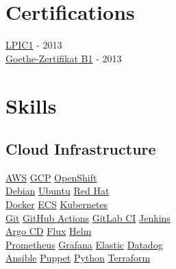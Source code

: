 \documentclass[]{willianpaixao-resume}
\begin{document}
\begin{minipage}[t]{0.35\textwidth}
\section{Certifications}
\href{https://www.lpi.org/certification/get-certified-lpi/lpic-1-linux-server-professional/}{LPIC1} - 2013 \\
\href{https://www.goethe.de/en/spr/kup/prf/prf/gb1.html}{Goethe-Zertifikat B1} - 2013
\sectionsep


\section{Skills}
\subsection{Cloud Infrastructure}
\href{https://aws.amazon.com/}{AWS}\textbullet{}
\href{https://cloud.google.com/}{GCP}\textbullet{}
\href{https://www.redhat.com/en/technologies/cloud-computing/openshift}{OpenShift}\\
\href{https://www.debian.org/}{Debian}\textbullet{}
\href{https://ubuntu.com/}{Ubuntu}\textbullet{}
\href{https://www.redhat.com/}{Red Hat}\\
\href{http://www.docker.com/}{Docker}\textbullet{}
\href{https://aws.amazon.com/ecs/}{ECS}\textbullet{}
\href{https://kubernetes.io/}{Kubernetes}\\
\href{https://git-scm.com/}{Git}\textbullet{}
\href{https://github.com/features/actions}{GitHub Actions}\textbullet{}
\href{https://gitlab.com}{GitLab CI}\textbullet{}
\href{https://jenkins.io/}{Jenkins}\\
\href{https://argo-cd.readthedocs.io/}{Argo CD}\textbullet{}
\href{https://fluxcd.io/}{Flux}\textbullet{}
\href{https://helm.sh/}{Helm}\\
\href{https://prometheus.io/}{Prometheus}\textbullet{}
\href{https://grafana.com/}{Grafana}\textbullet{}
\href{https://www.elastic.co/}{Elastic}\textbullet{}
\href{https://www.datadoghq.com/}{Datadog}\\
\href{https://www.redhat.com/en/technologies/management/ansible}{Ansible}\textbullet{}
\href{https://www.puppet.com/}{Puppet}\textbullet{}
\href{https://www.python.org/}{Python}\textbullet{}
\href{https://www.terraform.io/}{Terraform}\\


\end{minipage}
\end{document}
